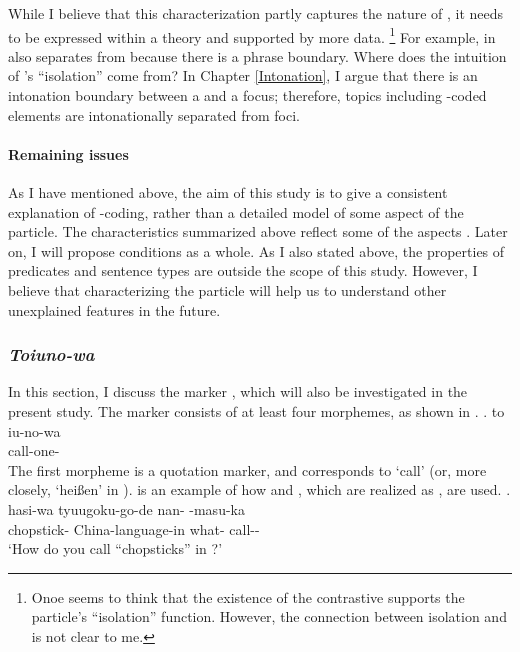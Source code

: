 While I believe that this characterization partly captures the nature of ,
it needs to be expressed within a theory and supported by more data.%
 \footnote{
 Onoe seems to think that the existence of the contrastive 
 supports the particle's ``isolation'' function.
 However, the connection between isolation and  is not clear to me.
 }
For example,
 in \Last[a] also separates  from  because
there is a phrase boundary.
Where does the intuition of 's ``isolation'' come from?
In Chapter \ref{Intonation},
I argue that there is an intonation boundary between a  and a focus;
therefore, topics including -coded elements are intonationally separated from foci.


\paragraph{Remaining issues}

As I have mentioned above,
the aim of this study is to give a consistent explanation of -coding,
rather than a detailed model of some aspect of the particle.
The characteristics summarized above reflect some of the aspects .
Later on, I will propose conditions  as a whole.
As I also stated above,
the properties of predicates and sentence types are outside the scope of this study.
However, I believe that characterizing the particle  will help us to understand other unexplained features in the future.

\subsubsection{\textit{Toiuno-wa}}\label{Back:GeneralChar:Toiunowa}

In this section, I discuss the marker , which will also be investigated in the present study. The marker consists of at least four morphemes, as shown in \Next.
\exg. to iu-no-wa \\
	 call-one- \\

The first morpheme  is a quotation marker,
and  corresponds to `call' (or, more closely, `hei{\ss}en' in ).
\Next is an example of how  and , which are realized as , are used.
%
\exg. hasi-wa tyuugoku-go-de nan- -masu-ka \\
		chopstick- China-language-in what- call-- \\
		`How do you call ``chopsticks'' in ?'
		\hfill{\cite[][p.\ 81]{masuokatakubo92}}

